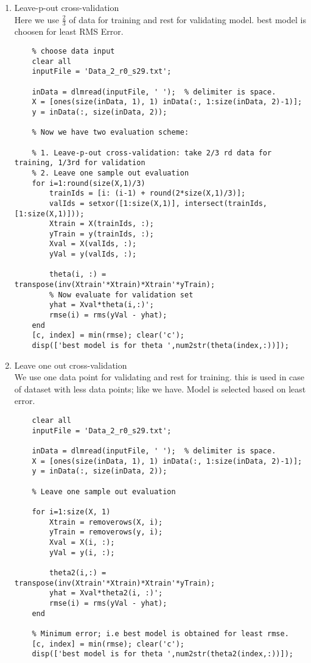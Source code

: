 \documentclass{article}
\begin{document}
\begin{enumerate}
  \item Leave-p-out cross-validation\\
  Here we use $\frac{2}{3}$ of data for training and rest for validating model. best model is choosen for least RMS Error.\\
  \begin{lstlisting}
    % choose data input
    clear all
    inputFile = 'Data_2_r0_s29.txt';

    inData = dlmread(inputFile, ' ');  % delimiter is space.
    X = [ones(size(inData, 1), 1) inData(:, 1:size(inData, 2)-1)];
    y = inData(:, size(inData, 2));

    % Now we have two evaluation scheme:

    % 1. Leave-p-out cross-validation: take 2/3 rd data for training, 1/3rd for validation
    % 2. Leave one sample out evaluation
    for i=1:round(size(X,1)/3)
        trainIds = [i: (i-1) + round(2*size(X,1)/3)];
        valIds = setxor([1:size(X,1)], intersect(trainIds, [1:size(X,1)]));
        Xtrain = X(trainIds, :);
        yTrain = y(trainIds, :);
        Xval = X(valIds, :);
        yVal = y(valIds, :);

        theta(i, :) = transpose(inv(Xtrain'*Xtrain)*Xtrain'*yTrain);
        % Now evaluate for validation set
        yhat = Xval*theta(i,:)';
        rmse(i) = rms(yVal - yhat);
    end
    [c, index] = min(rmse); clear('c');
    disp(['best model is for theta ',num2str(theta(index,:))]);
  \end{lstlisting}
  \item Leave one out cross-validation\\
  We use one data point for validating and rest for training. this is used in case of dataset with less data points; like we have. Model is selected based on least error.
  \begin{lstlisting}
    clear all
    inputFile = 'Data_2_r0_s29.txt';

    inData = dlmread(inputFile, ' ');  % delimiter is space.
    X = [ones(size(inData, 1), 1) inData(:, 1:size(inData, 2)-1)];
    y = inData(:, size(inData, 2));

    % Leave one sample out evaluation

    for i=1:size(X, 1)
        Xtrain = removerows(X, i);
        yTrain = removerows(y, i);
        Xval = X(i, :);
        yVal = y(i, :);

        theta2(i,:) = transpose(inv(Xtrain'*Xtrain)*Xtrain'*yTrain);
        yhat = Xval*theta2(i, :)';
        rmse(i) = rms(yVal - yhat);
    end

    % Minimum error; i.e best model is obtained for least rmse.
    [c, index] = min(rmse); clear('c');
    disp(['best model is for theta ',num2str(theta2(index,:))]);
  \end{lstlisting}
\end{enumerate}
\end{document}
